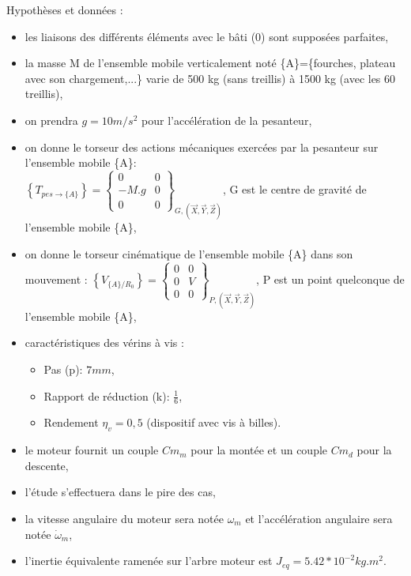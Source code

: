 Hypothèses et données :
\begin{itemize}
 \item les liaisons des différents éléments avec le bâti (0) sont supposées parfaites,
 \item la masse M de l'ensemble mobile verticalement noté \{A\}=\{fourches, plateau avec son chargement,...\} varie de 500 kg (sans treillis)  à 1500 kg (avec les 60 treillis),
 \item on prendra $g=10m/s^2$ pour l'accélération de la pesanteur,
 \item on donne le torseur des actions mécaniques exercées par la pesanteur sur l'ensemble mobile \{A\}: \\
$\left\{T_{pes\rightarrow \{A\}}\right\}=\left\{\begin{array}{cc} 0 & 0 \\ -M.g & 0 \\ 0 & 0 \end{array}\right\}_{G,(\overrightarrow{X},\overrightarrow{Y},\overrightarrow{Z})}$, G est le centre de gravité de l'ensemble mobile \{A\},
 \item on donne le torseur cinématique de l'ensemble mobile \{A\} dans son mouvement :
 $\left\{V_{\{A\}/R_0}\right\}=\left\{\begin{array}{cc} 0 & 0 \\ 0 & V \\ 0 & 0 \end{array}\right\}_{P,(\overrightarrow{X},\overrightarrow{Y},\overrightarrow{Z})}$, P est un point quelconque de l'ensemble mobile \{A\},
 \item caractéristiques des vérins à vis :
 \begin{itemize}
  \item Pas (p): $7mm$,
  \item Rapport de réduction (k): $\frac{1}{6}$,
  \item Rendement $\eta_v=0,5$ (dispositif avec vis à billes).
   \end{itemize}
 \item le moteur fournit un couple $Cm_m$ pour la montée et un couple $Cm_d$ pour la descente,
 \item l'étude s'effectuera dans le pire des cas,
 \item la vitesse angulaire du moteur sera notée $\omega_m$ et l'accélération angulaire sera notée $\dot{\omega}_m$,
 \item l'inertie équivalente ramenée sur l'arbre moteur est $J_{eq}=5.42*10^{-2}kg.m^2$.
\end{itemize}

